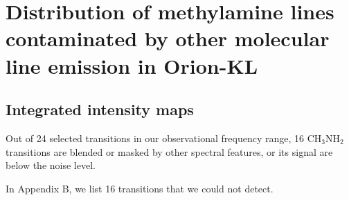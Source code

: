 \chapter{Distribution of methylamine lines contaminated by other molecular line emission in Orion-KL
\label{chap:appendixB}}

\section{Integrated intensity maps}
Out of 24 selected transitions in our observational frequency range, 16 CH$_{3}$NH$_{2}$ transitions are 
blended or masked by other spectral features, or its signal are below the noise level.

In Appendix B, we list 16 transitions that we could not detect.
\newpage

